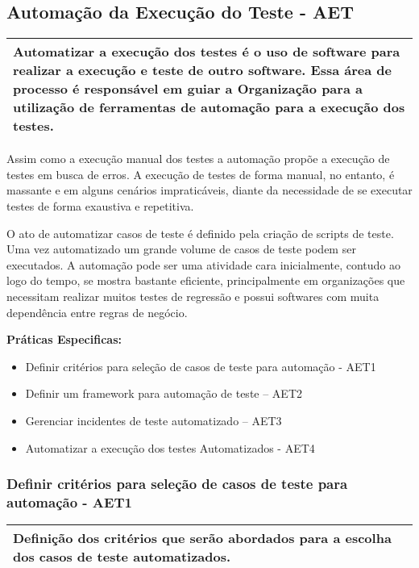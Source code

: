 \subsection{Automação da Execução do Teste - AET}
\label{sec:aet}

\begin{table}[!ht]
\centering
\begin{tabular}{|p{130mm}|}
\hline
Automatizar a execução dos testes é o uso de software para realizar a execução e teste de outro software. Essa área de processo é responsável em guiar a Organização para a utilização de ferramentas de automação para a execução dos testes. \\ 
\hline
\end{tabular}
\end{table}

Assim como a execução manual dos testes a automação propõe a execução de testes em busca de erros. A execução de testes de forma manual, no entanto, é massante e em alguns cenários impraticáveis, diante da necessidade de se executar testes de forma exaustiva e repetitiva.

O ato de automatizar casos de teste é definido pela criação de scripts de teste. Uma vez automatizado um grande volume de casos de teste podem ser executados. A automação pode ser uma atividade cara inicialmente, contudo ao logo do tempo, se mostra bastante eficiente, principalmente em organizações que necessitam realizar muitos testes de regressão e possui softwares com muita dependência entre regras de negócio.

\textbf{Práticas Especificas:}
\begin{itemize}
    \item Definir critérios para seleção de casos de teste para automação - AET1
    \item Definir um framework para automação de teste – AET2
    \item Gerenciar incidentes de teste automatizado – AET3
    \item Automatizar a execução dos testes Automatizados - AET4
\end{itemize}

\subsubsection{Definir critérios para seleção de casos de teste para automação - AET1}
\label{sec:aet1}

\begin{table}[!ht]
\centering
\begin{tabular}{|p{130mm}|}
\hline
Definição dos critérios que serão abordados para a escolha dos casos de teste automatizados. \\ 
\hline
\end{tabular}
\end{table}

